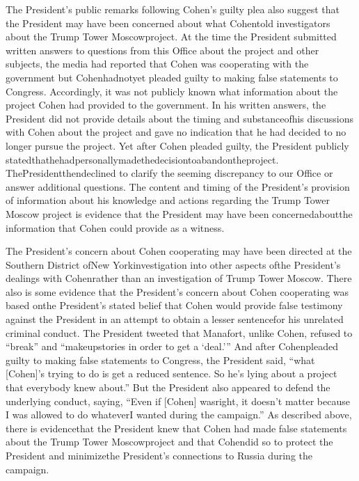 {The President’s public remarks following Cohen’s guilty plea also suggest that the President may have been concerned about what Cohentold investigators about the Trump Tower Moscowproject. At the time the President submitted written answers to questions from this Office about the project and other subjects, the media had reported that Cohen was cooperating with the government but Cohenhadnotyet pleaded guilty to making false statements to Congress. Accordingly, it was not publicly known what information about the project Cohen had provided to the government. In his written answers, the President did not provide details about the timing and substanceofhis discussions with Cohen about the project and gave no indication that he had decided to no longer pursue the project. Yet after Cohen pleaded guilty, the President publicly statedthathehadpersonallymadethedecisiontoabandontheproject. ThePresidentthendeclined to clarify the seeming discrepancy to our Office or answer additional questions. The content and timing of the President’s provision of information about his knowledge and actions regarding the Trump Tower Moscow project is evidence that the President may have been concernedaboutthe
information that Cohen could provide as a witness.

The President’s concern about Cohen cooperating may have been directed at the Southern District ofNew Yorkinvestigation into other aspects ofthe President’s dealings with Cohenrather than an investigation of Trump Tower Moscow. There also is some evidence that the President’s concern about Cohen cooperating was based onthe President’s stated belief that Cohen would provide false testimony against the President in an attempt to obtain a lesser sentencefor his unrelated criminal conduct. The President tweeted that Manafort, unlike Cohen, refused to “break” and “makeupstories in order to get a ‘deal.’” And after Cohenpleaded guilty to making false statements to Congress, the President said, “what [Cohen]’s trying to do is get a reduced sentence. So he’s lying about a project that everybody knew about.” But the President also appeared to defend the underlying conduct, saying, “Even if [Cohen] wasright, it doesn’t matter because I was allowed to do whateverI wanted during the campaign.” As described above, there is evidencethat the President knew that Cohen had made false statements about the Trump Tower Moscowproject and that Cohendid so to protect the President and minimizethe President’s connections to Russia during the campaign.

}
